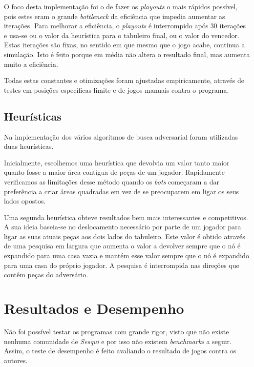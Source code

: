 \documentclass[12pt,a4paper,oneside]{article}
\begin{document}
O foco desta implementação foi o de fazer os \textit{playouts} o mais
rápidos possível, pois estes eram o grande \textit{bottleneck} da
eficiência que impedia aumentar as iterações. Para melhorar a
eficiência, o \textit{playouts} é interrompido após 30 iterações e
usa-se ou o valor da heurística para o tabuleiro final, ou o valor do
vencedor. Estas iterações são fixas, no sentido em que mesmo que o
jogo acabe, continua a simulação. Isto é feito porque em média não
altera o resultado final, mas aumenta muito a eficiência.

Todas estas constantes e otimizações foram ajustadas empiricamente,
através de testes em posições específicas limite e de jogos manuais
contra o programa.

\subsection{Heurísticas}

Na implementação dos vários algoritmos de busca adversarial foram
utilizadas duas heurísticas.

Inicialmente, escolhemos uma heurística que devolvia um valor tanto
maior quanto fosse a maior área contígua de peças de um
jogador. Rapidamente verificamos as limitações desse método quando os
\emph{bots} começaram a dar preferência a criar áreas quadradas em vez
de se preocuparem em ligar os seus lados opostos.

Uma segunda heurística obteve resultados bem mais interessantes e
competitivos. A sua ideia baseia-se no deslocamento necessário por
parte de um jogador para ligar as suas atuais peças aos dois lados do
tabuleiro. Este valor é obtido através de uma pesquisa em largura que
aumenta o valor a devolver sempre que o nó é expandido para uma casa
vazia e mantém esse valor sempre que o nó é expandido para uma casa do
próprio jogador. A pesquisa é interrompida nas direções que contêm
peças do adversário.



\section{Resultados e Desempenho}
\label{sec:resdes}

Não foi possível testar os programas com grande rigor, visto que não
existe nenhuma comunidade de \textit{Sesqui} e por isso não existem
\textit{benchmarks} a seguir. Assim, o teste de desempenho é feito
avaliando o resultado de jogos contra os autores.
\end{document}
